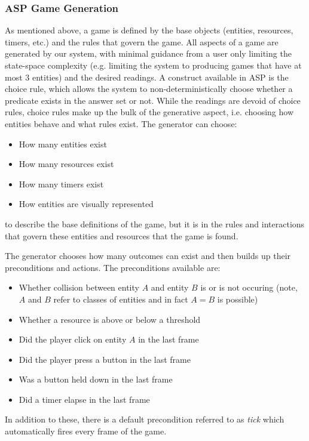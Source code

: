 \documentclass[a4paper]{article}
\begin{document}
\subsubsection{ASP Game Generation}

As mentioned above, a game is defined by the base objects (entities, resources, timers, etc.) and the rules that govern the game.  All aspects of a game are generated by our system, with minimal guidance from a user only limiting the state-space complexity (e.g. limiting the system to producing games that have at most 3 entities) and the desired readings.  A construct available in ASP is the choice rule, which allows the system to non-deterministically choose whether a predicate exists in the answer set or not.  While the readings are devoid of choice rules, choice rules make up the bulk of the generative aspect, i.e. choosing how entities behave and what rules exist.  The generator can choose:

\begin{itemize}
\item How many entities exist
\item How many resources exist
\item How many timers exist
\item How entities are visually represented
\end{itemize}

to describe the base definitions of the game, but it is in the rules and interactions that govern these entities and resources that the game is found.

The generator chooses how many outcomes can exist and then builds up their preconditions and actions.  The preconditions available are:
\begin{itemize}
\item Whether collision between entity $A$ and entity $B$ is or is not occuring (note, $A$ and $B$ refer to classes of entities and in fact $A=B$ is possible)
\item Whether a resource is above or below a threshold
\item Did the player click on entity $A$ in the last frame
\item Did the player press a button in the last frame
\item Was a button held down in the last frame
\item Did a timer elapse in the last frame
\end{itemize}

In addition to these, there is a default precondition referred to as \textit{tick} which automatically fires every frame of the game.
\end{document}
